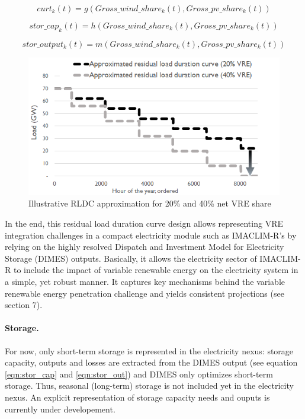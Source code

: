\begin{dmath}
    {curt_{k}}(t) = g(Gross\_wind\_share_{k}(t),Gross\_pv\_share_{k}(t))
    \label{eqn:curt}
\end{dmath}

\begin{dmath}
    {stor\_cap_{k}}(t) = h(Gross\_wind\_share_{k}(t),Gross\_pv\_share_{k}(t))
    \label{eqn:stor_cap}
\end{dmath}

\begin{dmath}
    {stor\_output_{k}}(t) = m(Gross\_wind\_share_{k}(t),Gross\_pv\_share_{k}(t))
    \label{eqn:stor_out}
\end{dmath}




\begin{figure}[H]
    \includegraphics[scale=0.8]{figures&tables/LDC&RLDC.png}
    \centering
    \caption{Illustrative RLDC approximation for 20\% and 40\% net VRE share}
    \label{fig:RLDCapprox}
\end{figure}

In the end, this residual load duration curve design allows representing VRE integration challenges in a compact electricity module such as IMACLIM-R's by relying on the highly resolved Dispatch and Investment Model for Electricity Storage (DIMES)  outputs. Basically, it allows the electricity sector of IMACLIM-R to include the impact of variable renewable energy on the electricity system in a simple, yet robust manner. It captures key mechanisms behind the variable renewable energy penetration challenge and yields consistent projections (see section 7).

\paragraph*{Storage.}
For now, only short-term storage is represented in the electricity nexus: storage capacity, outputs and losses are extracted from the DIMES output (see equation \ref{eqn:stor_cap} and \ref{eqn:stor_out}) and DIMES only optimizes short-term storage. Thus, seasonal (long-term) storage is not included yet in the electricity nexus. An explicit representation of storage capacity needs and ouputs is currently under developement.

